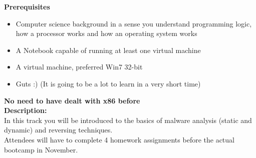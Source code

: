 \def\abstracttitle{Introduction to x86 RE}
\def\abstractcomment{Track 1: welcome party}
\def\abstractowner{Mari0n}

\thispagestyle{abstract}

  \textbf{Prerequisites}
  \begin{itemize}
  	\item Computer science background in a sense you understand programming logic, how a processor works and how an operating system works
  	\item A Notebook capable of running at least one virtual machine
  	\item A virtual machine, preferred Win7 32-bit
  	\item Guts :) (It is going to be a lot to learn in a very short time)
  \end{itemize}

  \textbf{No need to have dealt with x86 before}\\

  \textbf{Description:}\\

  In this track you will be introduced to the basics of malware analysis (static and dynamic) and reversing techniques.\\

  Attendees will have to complete 4 homework assignments before the actual bootcamp in November.\\
